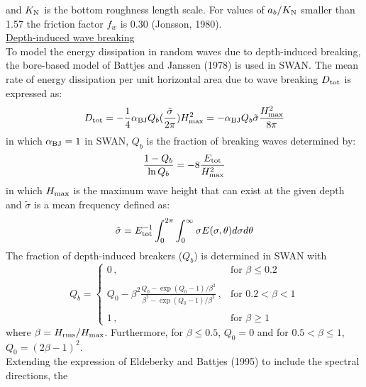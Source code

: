 \documentclass[12pt]{book}
\begin{document}
and $K_{\rm N}$ is the bottom roughness length scale. For values of $a_b/K_{\rm N}$ smaller than 1.57 the
friction factor $f_w$ is 0.30 (Jonsson, 1980).
\nocite{Jon76C,Jon80}
\\[2ex]
\noindent
\underline{Depth-induced wave breaking}\\[2ex]
To model the energy dissipation in random waves due to depth-induced breaking, the bore-based model
of Battjes and Janssen (1978) is used in SWAN. The mean rate of energy dissipation per unit horizontal
area due to wave breaking $D_{\rm tot}$ is expressed as:
\begin{equation}
  D_{\rm tot} = - \frac{1}{4} \alpha_{\rm BJ} Q_b (\frac{\tilde{\sigma}}{2\pi}) H^2_{\rm max}
              = - \alpha_{\rm BJ} Q_b \tilde{\sigma} \frac{H^2_{\rm max}}{8\pi}
  \label{eq3-22}
\end{equation}
in which $\alpha_{\rm BJ} = 1$ in SWAN, $Q_b$ is the fraction of breaking waves determined by:
\begin{equation}
  \frac{1 - Q_b}{\ln Q_b} = -8 \frac{E_{\rm tot}}{H_{\rm max}^2}
  \label{eq3-23}
\end{equation}
in which $H_{\rm max}$ is the maximum wave height that can exist at the given depth and ${\tilde{\sigma}}$
is a mean frequency defined as:
\begin{equation}
  \tilde{\sigma} = E^{-1}_{\rm tot} \int_{0}^{2\pi} \int_{0}^{\infty} \sigma E(\sigma,\theta) d\sigma d\theta
  \label{eq3-24}
\end{equation}
The fraction of depth-induced breakers ($Q_b$) is determined in SWAN with
\begin{equation}
   Q_b =
    \left\{
      \begin{array}{ll}
         0 \, , & \mbox{for } \beta \leq 0.2 \\
         \\
         Q_0 - \beta^2 \frac{Q_0 - \exp{(Q_0 - 1)/\beta^2}}{\beta^2 - \exp{(Q_0 - 1)/\beta^2}}
         \, , & \mbox{for }  0.2 < \beta < 1\\
         \\
         1 \, , & \mbox{for }  \beta \geq 1
      \end{array}
    \right.
  \label{eq3-25}
\end{equation}
where $\beta = H_{\rm rms}/H_{\rm max}$. Furthermore, for $\beta \leq 0.5$, $Q_0 = 0$ and for
$0.5 < \beta \leq 1$, $Q_0 = (2\beta-1)^2$.
\\[2ex]
\noindent
Extending the expression of Eldeberky and Battjes (1995) to include the spectral directions, the
\end{document}
